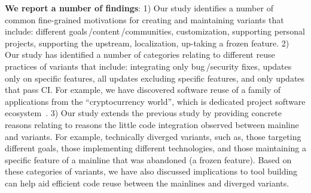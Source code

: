 \nd \textbf{We report a number of findings}: 1) Our study identifies a number of common fine-grained motivations for creating and maintaining variants that include: different goals\,/content\,/communities, customization, supporting personal projects, supporting the upstream, localization, up-taking a frozen feature.
2) Our study has identified a number of categories relating to different reuse practices of variants that include: integrating only bug\,/security fixes, updates only on specific features, all updates excluding specific features, and only updates that pass CI. For example, we have discovered software reuse of a family of applications from the ``cryptocurrency world'', which is dedicated project software ecosystem~\cite{tommens:2020}. 
3) Our study extends the previous study by providing concrete reasons relating to reasons the little code integration observed between mainline and variants. For example, technically diverged variants, such as, those targeting different goals, those implementing different technologies, and those maintaining a specific feature of a mainline that was abandoned (a frozen feature). Based on these categories of variants, we have also discussed implications to tool building can help aid efficient code reuse between the mainlines and diverged variants.

